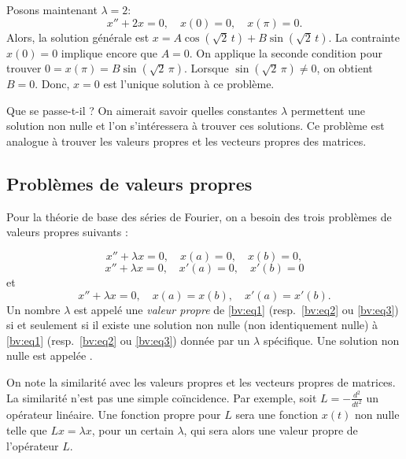\begin{example}
Posons maintenant $\lambda = 2$: 
\begin{equation*}
x'' + 2 x = 0, \quad x(0) = 0, \quad x(\pi) = 0.
\end{equation*}
Alors, la solution générale est
$x= A \cos ( \sqrt{2}\,t) + B \sin ( \sqrt{2}\,t)$.  La contrainte $x(0) = 0$ implique encore que $A = 0$.  On applique la seconde condition pour trouver 
$0=x(\pi) = B \sin ( \sqrt{2}\,\pi)$.
Lorsque $\sin ( \sqrt{2}\,\pi) \not= 0$, on obtient
$B = 0$.  
Donc, $x=0$ est l'unique solution à ce problème.
\end{example}

Que se passe-t-il ?  On aimerait savoir quelles constantes  $\lambda$ permettent une solution non nulle et l'on s'intéressera à trouver ces solutions. Ce problème est analogue  à trouver les valeurs propres et les vecteurs propres des matrices.

\subsection{Problèmes de valeurs propres}

Pour la théorie de base des séries de Fourier, on a besoin
des trois problèmes de valeurs propres suivants : 

\begin{equation} \label{bv:eq1}
x'' + \lambda x = 0, \quad x(a) = 0, \quad x(b) = 0 ,
\end{equation}
\begin{equation} \label{bv:eq2}
x'' + \lambda x = 0, \quad x'(a) = 0, \quad x'(b) = 0
\end{equation}
et
\begin{equation} \label{bv:eq3}
x'' + \lambda x = 0, \quad x(a) = x(b), \quad x'(a) = x'(b) .
\end{equation}
Un nombre $\lambda$ est appelé une
\emph{valeur propre }
de \eqref{bv:eq1}
(resp.\ \eqref{bv:eq2} ou \eqref{bv:eq3}) si et seulement si il existe une solution non nulle (non identiquement nulle) à \eqref{bv:eq1}
(resp.\ \eqref{bv:eq2} ou \eqref{bv:eq3})
donnée par un $\lambda$ spécifique. Une solution non nulle est appelée 
\emph{}.

On note la similarité avec les valeurs propres et les vecteurs propres de matrices. La similarité n'est pas une simple coïncidence.  Par exemple, soit $L = -\frac{d^2}{{dt}^2}$ un opérateur linéaire.  Une fonction propre pour $L$ sera une fonction $x(t)$ non nulle telle que $Lx = \lambda x$, pour un certain $\lambda$, qui sera alors une valeur propre de l'opérateur $L$.

